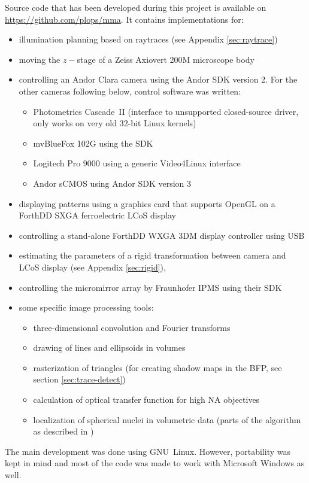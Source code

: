 \documentclass[oneside,a4paper,12pt,BCOR20mm,DIV14]{scrbook} %
\begin{document}
Source code that has been developed during this project is available
on \url{https://github.com/plops/mma}.  It contains implementations
for:
\begin{itemize}
\item illumination planning based on raytraces (see Appendix
  \ref{sec:raytrace})
\item moving the $z-$stage of a Zeiss Axiovert 200M microscope body
\item controlling an Andor Clara camera using the Andor SDK version
  2. For the other cameras following below, control software was written:
  \begin{itemize}
  \item Photometrics Cascade~II (interface to unsupported
    closed-source driver, only works on very old 32-bit Linux kernels)
  \item mvBlueFox 102G using the SDK
  \item Logitech Pro 9000 using a generic Video4Linux interface
  \item Andor sCMOS using Andor SDK version 3
  \end{itemize}
\item displaying patterns using a graphics card that supports OpenGL
  on a ForthDD SXGA ferroelectric LCoS display
\item controlling a stand-alone ForthDD WXGA 3DM display controller
  using USB
\item estimating the parameters of a rigid transformation between
  camera and LCoS display (see Appendix \ref{sec:rigid}),
\item controlling the micromirror array by Fraunhofer IPMS using
  their SDK
\item some specific image processing tools:
  \begin{itemize}
  \item three-dimensional convolution and Fourier transforms
  \item drawing of lines and ellipsoids in volumes
  \item rasterization of triangles (for creating shadow maps in the
    BFP, see section \ref{sec:trace-detect})
  \item calculation of optical transfer function for high NA
    objectives
  \item localization of spherical nuclei in volumetric data (parts of
    the algorithm as described in \citet{Santella2010})
  \end{itemize}
\end{itemize}
The main development was done using GNU~Linux. However, portability
was kept in mind and most of the code was made to work with Microsoft
Windows as well.
\end{document}
